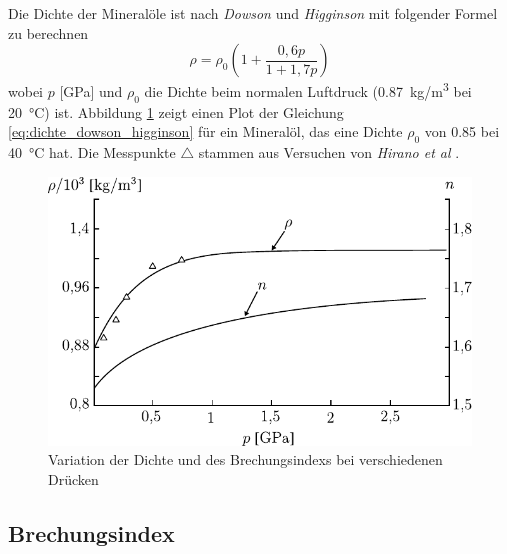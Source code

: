 Die Dichte der Mineralöle ist nach \textit{Dowson} und \textit{Higginson} \cite{dowson_1966} mit folgender Formel zu berechnen
\begin{equation}
    \label{eq:dichte_dowson_higginson}
    \rho = \rho_0 \left( 1 + \frac{0,6  p}{1 + 1,7  p} \right)
\end{equation}
%
wobei $p$ [\si{GPa}] und $\rho_0$ die Dichte beim normalen Luftdruck (\SI{0,87}{kg/m^3} bei \SI{20}{\degreeCelsius}) ist.
Abbildung \ref{fig:variation_der_dichte_bei_verschiedenen_druecke} zeigt einen Plot der Gleichung \ref{eq:dichte_dowson_higginson} für ein Mineralöl, das eine Dichte $\rho_0$ von \num{0.85} bei \SI{40}{\degreeCelsius} hat.
Die Messpunkte $\triangle$ stammen aus Versuchen von \textit{Hirano et al} \cite{hirano}.
\begin{figure}[htb]
    \centering
    \includegraphics[]{./images/dichte_brechungsindex_temperatur.pdf}
    \caption{Variation der Dichte und des Brechungsindexs bei verschiedenen Drücken \cite{gohar_1988}}
    \label{fig:variation_der_dichte_bei_verschiedenen_druecke}
\end{figure}

\subsection*{Brechungsindex}
\label{sub:brechungsindex}

